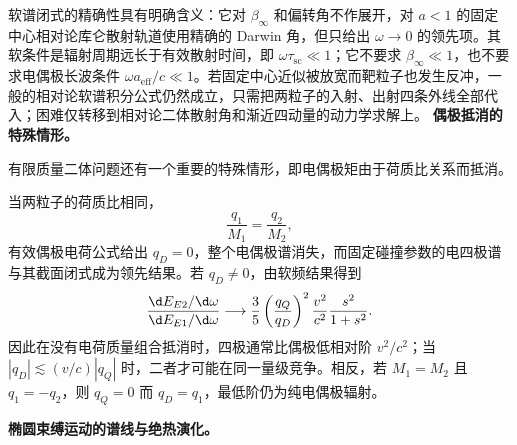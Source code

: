 软谱闭式的精确性具有明确含义：它对 $\beta_\infty$ 和偏转角不作展开，对 $a<1$ 的固定中心相对论库仑散射轨道使用精确的 Darwin 角，但只给出 $\omega\to0$ 的领先项。其软条件是辐射周期远长于有效散射时间，即 $\omega\tau_{\mathrm{sc}}\ll1$；它不要求 $\beta_\infty\ll1$，也不要求电偶极长波条件 $\omega a_{\mathrm{eff}}/c\ll1$。若固定中心近似被放宽而靶粒子也发生反冲，一般的相对论软谱积分公式仍然成立，只需把两粒子的入射、出射四条外线全部代入；困难仅转移到相对论二体散射角和渐近四动量的动力学求解上。
\textbf{偶极抵消的特殊情形。}

有限质量二体问题还有一个重要的特殊情形，即电偶极矩由于荷质比关系而抵消。

当两粒子的荷质比相同，
\begin{equation*}
	\frac{q_1}{M_1}=\frac{q_2}{M_2},
\end{equation*}
有效偶极电荷公式给出 $q_D=0$，整个电偶极谱消失，而固定碰撞参数的电四极谱与其截面闭式成为领先结果。若 $q_D\neq0$，由软频结果得到
\begin{equation*}
	\frac{\d E_{E2}/\d\omega}{\d E_{E1}/\d\omega}
	\longrightarrow
	\frac{3}{5}\left(\frac{q_Q}{q_D}\right)^2
	\frac{v^2}{c^2}\frac{s^2}{1+s^2}.
\end{equation*}
因此在没有电荷质量组合抵消时，四极通常比偶极低相对阶 $v^2/c^2$；当 $|q_D|\lesssim(v/c)|q_Q|$ 时，二者才可能在同一量级竞争。相反，若 $M_1=M_2$ 且 $q_1=-q_2$，则 $q_Q=0$ 而 $q_D=q_1$，最低阶仍为纯电偶极辐射。

\textbf{椭圆束缚运动的谱线与绝热演化。}

